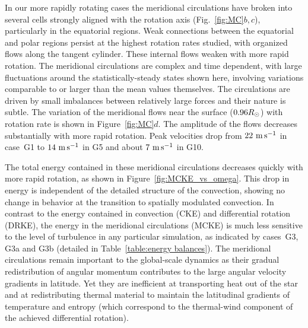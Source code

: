 In our more rapidly rotating cases the meridional circulations have
broken into several cells strongly aligned with the rotation axis
(Fig.~\ref{fig:MC}$b,c$), particularly in the equatorial regions.  Weak
connections between the equatorial and polar regions persist
at the highest rotation rates studied, with organized flows
along the tangent cylinder.  These internal flows weaken with more
rapid rotation.  The meridional circulations are complex and time dependent, with large
fluctuations around the statistically-steady states shown here,
involving variations comparable to or larger than the mean values themselves.  
The circulations are driven by small imbalances between relatively
large forces and their nature is subtle.
The variation of the meridional flows near the surface
($0.96R_\odot$) with rotation rate is shown in Figure~\ref{fig:MC}$d$.  
The amplitude of the
flows decreases substantially with more rapid rotation. Peak
velocities drop from $22~\mathrm{m}\thinspace \mathrm{s}^{-1}$ in case~G1 to $14~\mathrm{m}\thinspace \mathrm{s}^{-1}$ in G5 and about $7~\mathrm{m}\thinspace \mathrm{s}^{-1}$ in G10.  




The total energy contained in these meridional
circulations decreases quickly with more rapid rotation, as shown in
Figure~\ref{fig:MCKE_vs_omega}.  This drop in energy is independent
of the detailed structure of the convection, showing no change in
behavior at the transition to spatially modulated convection.  In
contrast to the energy contained in convection (CKE) and differential
rotation (DRKE), the energy in the meridional circulations (MCKE) is much
less sensitive to the level of turbulence in any particular
simulation, as indicated by cases~G3, G3a and G3b (detailed in
Table~\ref{table:energy balances}).
The meridional circulations remain important to the global-scale
dynamics as their gradual redistribution of angular momentum
contributes to the large angular velocity gradients in latitude. 
Yet they are inefficient at transporting heat out of the star and at
redistributing thermal material to maintain the latitudinal gradients of
temperature and entropy (which correspond to the thermal-wind component 
of the achieved differential rotation). 

